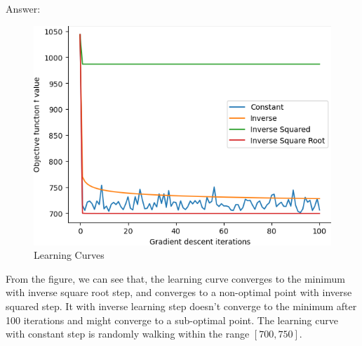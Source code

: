\documentclass{article}
\newenvironment{answer}{\par\begingroup\color{gre}Answer: }{\endgroup}
\begin{document}
\begin{answer}
	\begin{figure}[htbp!]
		\centering
		\includegraphics[width = .6\textwidth]{figs/learning_curve.png}
		\caption{Learning Curves}
	\end{figure}

	From the figure, we can see that, the learning curve converges to the minimum with inverse square root step, and converges to a non-optimal point with inverse squared step. It with inverse learning step doesn't converge to the minimum after 100 iterations and might converge to a sub-optimal point. The learning curve with constant step is randomly walking within the range $[700,750]$.
\end{answer}



\clearpage
\end{document}
